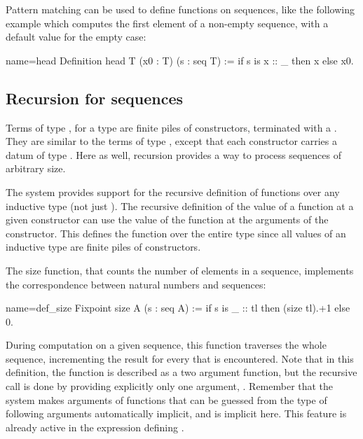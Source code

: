Pattern matching can be used to define functions on sequences, like
the following example which computes the first element of a non-empty
sequence, with a default value for the empty case:

\begin{coq}{name=head}{}
Definition head T (x0 : T) (s : seq T) := if s is x :: _ then x else x0.
\end{coq}

\subsection{Recursion for sequences}

Terms of type , for a type  are finite piles of
 constructors, terminated with a . They are similar to
the terms of type , except that each  constructor
carries a datum of type . Here as well, recursion provides a way
to process sequences of arbitrary size.


The \Coq{} system provides support for the recursive definition of
functions over any inductive type (not just ). The recursive
definition of the value of a
function at a given constructor can use the value of the function at
the arguments of the constructor. This defines the function over the
entire type since all values of an inductive type are finite piles of
constructors.

The size function, that counts the number of elements in a sequence,
implements the correspondence between natural numbers and sequences:

\begin{coq}{name=def_size}{}
Fixpoint size A (s : seq A) :=
  if s is _ :: tl then (size tl).+1 else 0.
\end{coq}
During computation on a given sequence, this function traverses
the whole sequence, incrementing the result for every
 that is encountered.  Note that in this
definition, the function  is described as a two argument
function, but the recursive call  is done by providing
explicitly only one argument, . Remember that
the \Coq{} system makes
arguments of functions that can be guessed from the type of following
arguments automatically implicit, and  is implicit here. This
feature is already active in the expression defining .

